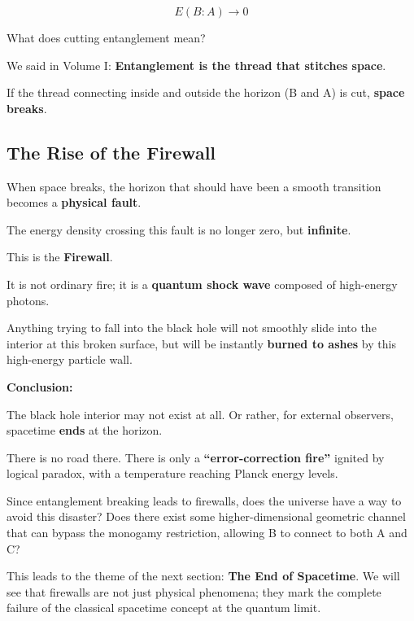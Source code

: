 \[E(B:A) \to 0\]

What does cutting entanglement mean?

We said in Volume I: \textbf{Entanglement is the thread that stitches space}.

If the thread connecting inside and outside the horizon (B and A) is cut, \textbf{space breaks}.

\subsection{The Rise of the Firewall}

When space breaks, the horizon that should have been a smooth transition becomes a \textbf{physical fault}.

The energy density crossing this fault is no longer zero, but \textbf{infinite}.

This is the \textbf{Firewall}.

It is not ordinary fire; it is a \textbf{quantum shock wave} composed of high-energy photons.

Anything trying to fall into the black hole will not smoothly slide into the interior at this broken surface, but will be instantly \textbf{burned to ashes} by this high-energy particle wall.

\textbf{Conclusion:}

The black hole interior may not exist at all. Or rather, for external observers, spacetime \textbf{ends} at the horizon.

There is no road there. There is only a \textbf{``error-correction fire''} ignited by logical paradox, with a temperature reaching Planck energy levels.

Since entanglement breaking leads to firewalls, does the universe have a way to avoid this disaster? Does there exist some higher-dimensional geometric channel that can bypass the monogamy restriction, allowing B to connect to both A and C?

This leads to the theme of the next section: \textbf{The End of Spacetime}. We will see that firewalls are not just physical phenomena; they mark the complete failure of the classical spacetime concept at the quantum limit.

